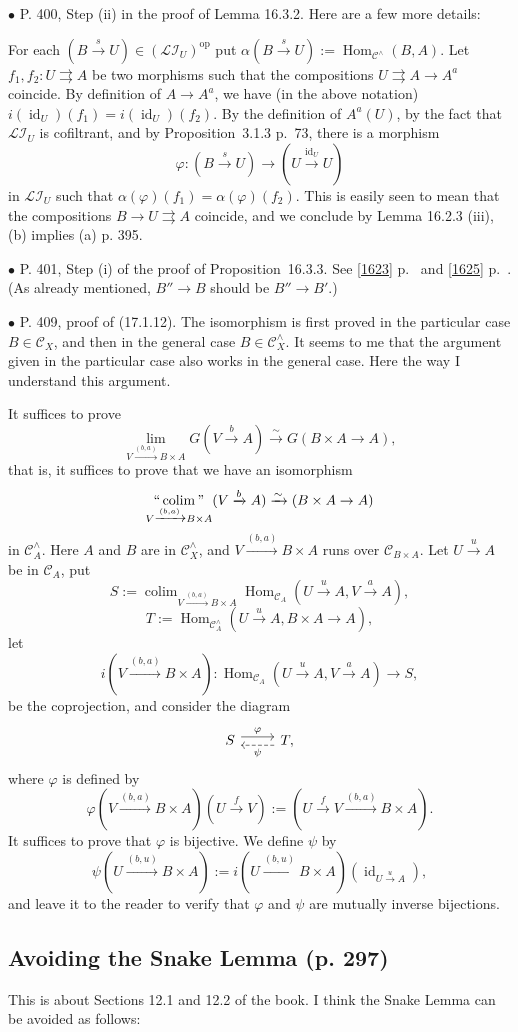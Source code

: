 \documentclass[12pt]{article}
\theoremstyle{remark}%
\newcommand{\bu}{\bullet}
\newcommand{\n}{\noindent}
\newcommand{\cc}{\mathcal}
\newcommand{\C}{\mathcal C}
\newcommand{\p}{\varphi}
\newcommand{\pa}{\rightrightarrows}
\newcommand{\xr}{\xrightarrow}
\newcommand{\pr}{Proposition}
\DeclareMathOperator*{\coli}{colim}
\DeclareMathOperator*{\co}{colim}
\DeclareMathOperator*{\ic}{``\coli"}
\DeclareMathOperator{\id}{id}
\DeclareMathOperator{\h}{Hom}
\DeclareMathOperator{\op}{op}
\begin{document}

\n$\bu$ P. 400, Step (ii) in the proof of Lemma 16.3.2. Here are a few more details: 

For each $(B\xr sU)\in(\cc{LI}_U)^{\op}$ put $\alpha(B\xr sU):=\h_{\C^\wedge}(B,A)$. Let $f_1,f_2:U\pa A$ be two morphisms such that the compositions $U\pa A\to A^a$ coincide. By definition of $A\to A^a$, we have (in the above notation) $i(\id_U)(f_1)=i(\id_U)(f_2)$. By the definition of $A^a(U)$, by the fact that $\cc{LI}_U$ is cofiltrant, and by \pr\ 3.1.3 p.~73, there is a morphism 
$$
\p:(B\xr sU)\to(U\xr{\id_U}U)
$$ 
in $\cc{LI}_U$ such that $\alpha(\p)(f_1)=\alpha(\p)(f_2)$. This is easily seen to mean that the compositions $B\to U\pa A$ coincide, and we conclude by Lemma 16.2.3 (iii), (b) implies (a) p. 395. 

\n$\bu$ P. 401, Step (i) of the proof of \pr\ 16.3.3. See \eqref{1623} p.~\pageref{1623} and \eqref{1625} p.~\pageref{1625}. (As already mentioned, $B''\to B$ should be $B''\to B'$.) 

\n$\bu$ P. 409, proof of (17.1.12). The isomorphism is first proved in the particular case $B\in\C_X$, and then in the general case $B\in\C_X^\wedge$. It seems to me that the argument given in the particular case also works in the general case. Here the way I understand this argument. 

It suffices to prove 
$$
\lim_{V\xr{(b,a)}B\times A}G(V\xr b A)\xr\sim G(B\times A\to A),
$$
that is, it suffices to prove that we have an isomorphism 
$$
\ic_{V\xr{(b,a)}B\times A}(V\xr b A)\xr\sim(B\times A\to A)
$$ 
in $\C_A^\wedge$. Here $A$ and $B$ are in $\C_X^\wedge$, and $V\xr{(b,a)}B\times A$ runs over $\C_{B\times A}$. Let $U\xr u A$ be in $\C_A$, put 
$$
S:=\displaystyle\co_{V\xr{(b,a)}B\times A}\h_{\C_A}(U\xr u A,V\xr a A),
$$ 
$$
T:=\h_{\C_A^\wedge}(U\xr u A,B\times A\to A),
$$ 
let 
$$
i(V\xr{(b,a)}B\times A):\h_{\C_A}(U\xr u A,V\xr a A)\to S,
$$ 
be the coprojection, and consider the diagram 
$$
\begin{tikzcd}
%
S\ar[yshift=.7ex]{r}{\p}&T,\ar[yshift=-.7ex,dashed]{l}{\psi}
%
\end{tikzcd}
$$ 
where $\p$ is defined by 
$$
\p(V\xr{(b,a)}B\times A)(U\xr fV):=(U\xr fV\xr{(b,a)}B\times A).
$$
It suffices to prove that $\p$ is bijective. We define $\psi$ by 
$$
\psi(U\xr{(b,u)}B\times A):=i(U\xr{(b,u)}B\times A)(\id_{U\xr uA}),
$$ 
and leave it to the reader to verify that $\p$ and $\psi$ are mutually inverse bijections. 
%
\subsection{Avoiding the Snake Lemma (p. 297)} %
%
This is about Sections 12.1 and 12.2 of the book. I think the Snake Lemma can be avoided as follows: 
\end{document}
